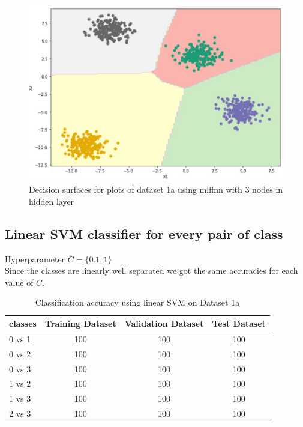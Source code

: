 \documentclass[11pt]{article}
\begin{document}
\begin{figure}[h]
\centering
\includegraphics[scale=0.3]{dataset1a_mlffnn_ds.jpg}
\caption{Decision surfaces for plots of dataset 1a using mlffnn with 3 nodes in hidden layer}
\label{fig:fig1.2.2}
\end{figure}
\newpage

\subsection{Linear SVM classifier for every pair of class}
Hyperparameter $C = \{0.1,1\}$\\

Since the classes are linearly well separated we got the same accuracies for each value of $C$.
\begin{table}[h!]
\label{tab:tab1.3.1}
\begin{center}
\begin{tabular}{|l|c|c|c|}
\hline
\textbf{classes} & \textbf{Training Dataset} & \textbf{Validation Dataset} &\textbf{Test Dataset}\\
\hline
0 vs 1 & 100 & 100 & 100\\
\hline
0 vs 2 & 100 & 100 & 100\\
\hline
0 vs 3 & 100 & 100 & 100\\
\hline
1 vs 2 & 100 & 100 & 100\\
\hline
1 vs 3 & 100 & 100 & 100\\
\hline
2 vs 3 & 100 & 100 & 100\\
\hline
\end{tabular}
\caption{Classification accuracy using linear SVM on Dataset 1a}
\end{center}
\end{table}
\end{document}
